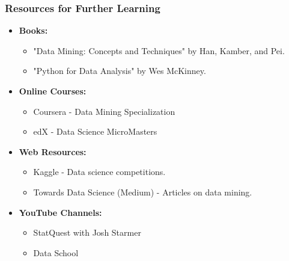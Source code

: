 \documentclass[aspectratio=169]{beamer}
\begin{document}
\begin{frame}[fragile]
    \frametitle{Resources for Further Learning}
    \begin{itemize}
        \item \textbf{Books:}
        \begin{itemize}
            \item "Data Mining: Concepts and Techniques" by Han, Kamber, and Pei.
            \item "Python for Data Analysis" by Wes McKinney.
        \end{itemize}
        \item \textbf{Online Courses:}
        \begin{itemize}
            \item Coursera - Data Mining Specialization
            \item edX - Data Science MicroMasters
        \end{itemize}
        \item \textbf{Web Resources:}
        \begin{itemize}
            \item Kaggle - Data science competitions.
            \item Towards Data Science (Medium) - Articles on data mining.
        \end{itemize}
        \item \textbf{YouTube Channels:}
        \begin{itemize}
            \item StatQuest with Josh Starmer
            \item Data School
        \end{itemize}
    \end{itemize}
\end{frame}
\end{document}
